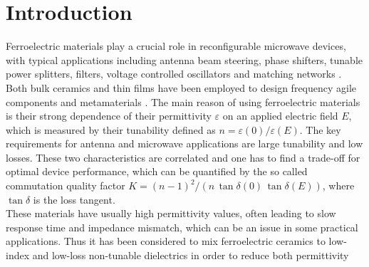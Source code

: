 \documentclass[aps,prb,11pt]{revtex4-1}
\begin{document}
 \section{Introduction}
 Ferroelectric materials play a crucial role in reconfigurable
 microwave devices, with typical applications including antenna beam steering,
 phase shifters, tunable power splitters, filters, voltage controlled oscillators and
 matching networks \cite{tagantsev_ferroelectric_2018}. Both bulk ceramics and thin films have
 been employed to design frequency agile components \cite{vendik_ferroelectric_1999, lancaster_thin-film_1998,xi_oxide_2000} and metamaterials \cite{hand_frequency_2008, zhao_experimental_2008}.
 The main reason of using
 ferroelectric materials is their strong dependence of their permittivity $\varepsilon$
 on an applied electric field $E$, which is measured by their tunability defined as $n = \varepsilon(0)/\varepsilon(E)$.
 The key requirements for antenna and microwave applications are large tunability and low losses.
 These two characteristics are correlated and one has to find a trade-off for optimal device performance, which can be quantified by the so called commutation quality factor
 $K = (n -1)^2/(n\, \tan\delta(0)\,\tan\delta(E))$, where $\tan\delta$ is the loss tangent.\\
 These materials have usually high permittivity values,
 often leading to slow response time and impedance mismatch, which can be an issue in some practical
 applications. Thus it has been considered to mix ferroelectric ceramics to low-index and
 low-loss non-tunable dielectrics in order to reduce both permittivity
\end{document}
